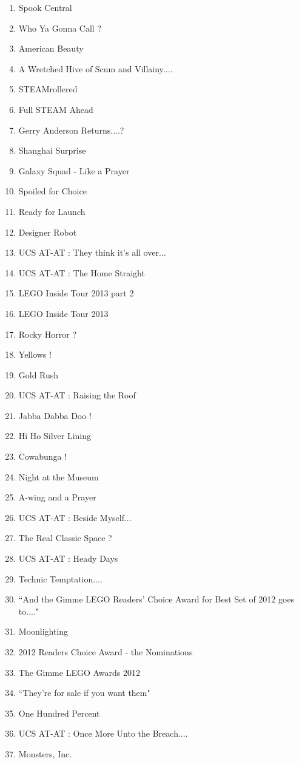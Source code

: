 \documentclass{article}
\begin{document}
\begin{enumerate}
\item Spook Central
\item Who Ya Gonna Call ?
\item American Beauty
\item A Wretched Hive of Scum and Villainy....
\item STEAMrollered
\item Full STEAM Ahead
\item Gerry Anderson Returns....?
\item Shanghai Surprise
\item Galaxy Squad - Like a Prayer
\item Spoiled for Choice
\item Ready for Launch
\item Designer Robot
\item UCS AT-AT : They think it's all over...
\item UCS AT-AT : The Home Straight
\item LEGO Inside Tour 2013 part 2
\item LEGO Inside Tour 2013
\item Rocky Horror ?
\item Yellows !
\item Gold Rush
\item UCS AT-AT : Raising the Roof
\item Jabba Dabba Doo !
\item Hi Ho Silver Lining
\item Cowabunga !
\item Night at the Museum
\item A-wing and a Prayer
\item UCS AT-AT : Beside Myself...
\item The Real Classic Space ?
\item UCS AT-AT : Heady Days
\item Technic Temptation....
\item ``And the Gimme LEGO Readers' Choice Award for Best Set of 2012 goes to...."
\item Moonlighting
\item 2012 Readers Choice Award - the Nominations
\item The Gimme LEGO Awards 2012
\item ``They're for sale if you want them"
\item One Hundred Percent
\item UCS AT-AT : Once More Unto the Breach....
\item Monsters, Inc.

\end{enumerate}
\end{document}
